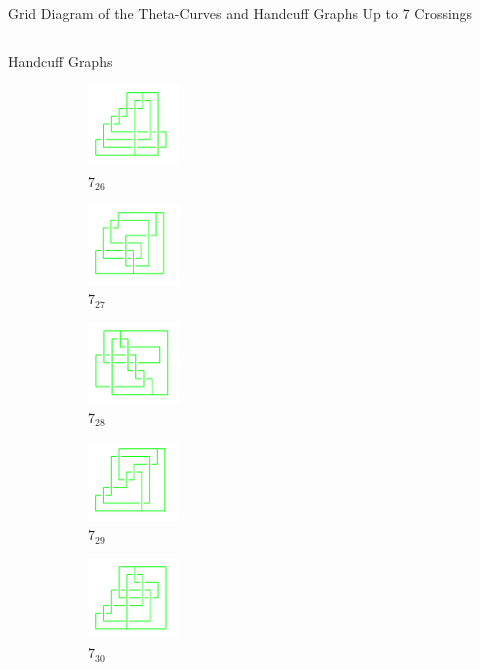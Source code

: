 \documentclass[final]{beamer}
\begin{document}
\begin{frame}[t]
\begin{alertblock}{Grid Diagram of the Theta-Curves and Handcuff Graphs Up to 7 Crossings}
\begin{columns}[t]
\begin{column}{0.3\textwidth}
\begin{alertblock}{Handcuff Graphs}
\begin{figure}
    \begin{subfigure}{0.15\textwidth}
    \includegraphics[width=2.4cm]{../Midterm_Poster/grid_diagram/handcuff_7_26.png}
    \caption{$7_{26}$} 
    \end{subfigure}
    \begin{subfigure}{0.15\textwidth}
    \includegraphics[width=2.4cm]{../Midterm_Poster/grid_diagram/handcuff_7_27.png}
    \caption{$7_{27}$} 
    \end{subfigure}
    \begin{subfigure}{0.15\textwidth}
    \includegraphics[width=2.4cm]{../Midterm_Poster/grid_diagram/handcuff_7_28.png}
    \caption{$7_{28}$} 
    \end{subfigure}
    \begin{subfigure}{0.15\textwidth}
    \includegraphics[width=2.4cm]{../Midterm_Poster/grid_diagram/handcuff_7_29.png}
    \caption{$7_{29}$} 
    \end{subfigure}
    \begin{subfigure}{0.15\textwidth}
    \includegraphics[width=2.4cm]{../Midterm_Poster/grid_diagram/handcuff_7_30.png}
    \caption{$7_{30}$} 
    \end{subfigure}
    \begin{subfigure}{0.15\textwidth}

\end{subfigure}
\end{figure}
\end{alertblock}
\end{column}
\end{columns}
\end{alertblock}
\end{frame}
\end{document}
